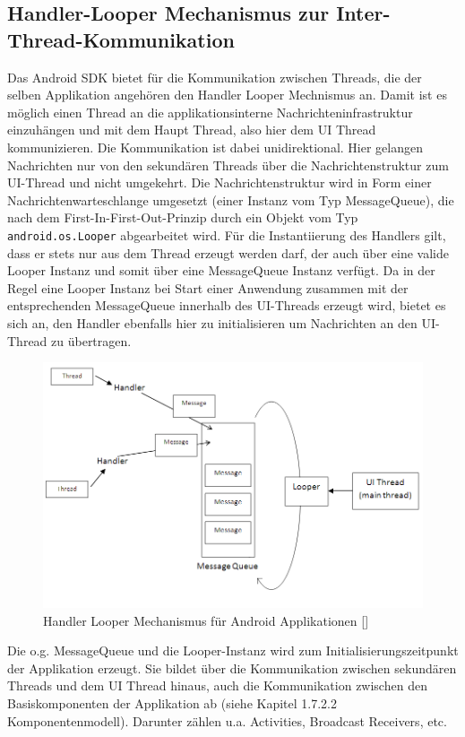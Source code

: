 \documentclass[12pt,oneside,a4paper,bibtotoc,liststotoc]{scrreprt}
\begin{document}
\subsection{Handler-Looper Mechanismus zur Inter-Thread-Kommunikation}
Das Android SDK bietet für die Kommunikation zwischen Threads, die der selben Applikation angehören den Handler Looper Mechnismus an. Damit ist es möglich einen Thread an die applikationsinterne Nachrichteninfrastruktur einzuhängen und mit dem Haupt Thread, also hier dem UI Thread kommunizieren. Die Kommunikation ist dabei unidirektional. Hier gelangen Nachrichten nur von den sekundären Threads über die Nachrichtenstruktur zum UI-Thread und nicht umgekehrt. Die Nachrichtenstruktur wird in Form einer Nachrichtenwarteschlange umgesetzt (einer Instanz vom Typ MessageQueue), die nach dem First-In-First-Out-Prinzip durch ein Objekt vom Typ \texttt{android.os.Looper} abgearbeitet wird. Für die Instantiierung des Handlers gilt, dass er stets nur aus dem Thread erzeugt werden darf, der auch über eine valide Looper Instanz und somit über eine MessageQueue Instanz verfügt. Da in der Regel eine Looper Instanz bei Start einer Anwendung zusammen mit der entsprechenden MessageQueue innerhalb des UI-Threads erzeugt wird, bietet es sich an, den Handler ebenfalls hier zu initialisieren um Nachrichten an den UI-Thread zu übertragen.
\begin{figure}[H]
  \begin{centering}
    \includegraphics[width=1\textwidth]{img/handler_looper.png}
    \caption{Handler Looper Mechanismus für Android Applikationen [\citet{handlerLooperBlock}]}
    \label{handler_looper}
  \end{centering}
\end{figure}
Die o.g. MessageQueue und die Looper-Instanz wird zum Initialisierungszeitpunkt der Applikation erzeugt. Sie bildet über die Kommunikation zwischen sekundären Threads und dem UI Thread hinaus, auch die Kommunikation zwischen den Basiskomponenten der Applikation ab (siehe Kapitel 1.7.2.2 Komponentenmodell). Darunter zählen u.a. Activities, Broadcast Receivers, etc.
\end{document}
